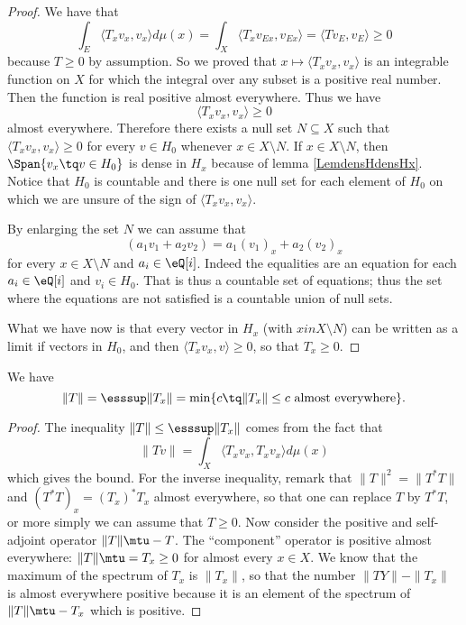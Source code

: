 \begin{proof}
	We have that
	\begin{equation}
		\int_E\langle T_xv_x, v_x\rangle d\mu(x)=\int_X\langle T_xv_{Ex}, v_{Ex}\rangle =\langle Tv_E, v_E\rangle \geq 0
	\end{equation}
	because $T\geq 0$ by assumption. So we proved that $x\mapsto\langle T_xv_x, v_x\rangle $ is an integrable function on $X$ for which the integral over any subset is a positive real number. Then the function is real positive almost everywhere. Thus we have
	\begin{equation}
		\langle T_xv_x, v_x\rangle \geq 0
	\end{equation}
	almost everywhere. Therefore there exists a null set $N\subseteq X$ such that $\langle T_xv_x, v_x\rangle \geq 0$ for every $v\in H_0$ whenever $x\in X\setminus N$. If $x\in X\setminus N$, then $\Span\{ v_x\tq v\in H_0 \}$ is dense in $H_x$ because of lemma \ref{LemdensHdensHx}. Notice that $H_0$ is countable and there is one null set for each element of $H_0$ on which we are unsure of the sign of $\langle T_xv_x, v_x\rangle $.

	By enlarging the set $N$ we can assume that 
	\begin{equation}
		(a_1v_1+a_2v_2)=a_1(v_1)_x+a_2(v_2)_x
	\end{equation}
	for every $x\in X\setminus N$ and $a_i\in\eQ[i]$. Indeed the equalities are an equation for each $a_i\in\eQ[i]$ and $v_i\in H_0$. That is thus a countable set of equations; thus the set where the equations are not satisfied is a countable union of null sets.

	What we have now is that every vector in $H_x$ (with $xin X\setminus N$) can be written as a limit if vectors in $H_0$, and then $\langle T_xv_x, v\rangle \geq 0$, so that $T_x\geq 0$.

\end{proof}

\begin{lemma}
We have
\begin{equation} 
	\| T \|=\esssup\| T_x \|=\min\{ c\tq \| T_x \|\leq c\text{ almost everywhere} \}.
\end{equation}
\end{lemma}

\begin{proof}
	The inequality $\| T \|\leq\esssup\| T_x \|$ comes from the fact that
	\begin{equation}
		\| Tv \|=\int_X\langle T_xv_x, T_xv_x\rangle d\mu(x)
	\end{equation}
	which gives the bound. For the inverse inequality, remark that $\| T \|^2=\| T^*T \|$ and $(T^*T)_x=(T_x)^*T_x$ almost everywhere, so that one can replace $T$ by $T^*T$, or more simply we can assume that $T\geq 0$. Now consider the positive and self-adjoint operator $\| T \|\mtu-T$. The ``component'' operator is positive almost everywhere: $\| T \|\mtu=T_x\geq 0$ for almost every $x\in X$. We know that the maximum of the spectrum of $T_x$ is $\| T_x \|$, so that the number $\| TY \|-\| T_x \|$ is almost everywhere positive because it is an element of the spectrum of $\| T \|\mtu-T_x$ which is positive.
\end{proof}

